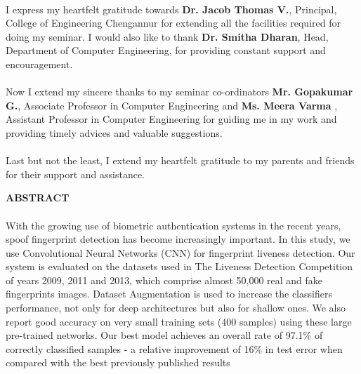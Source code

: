 \documentclass[a4paper,12pt,oneside]{article}
\begin{document}
\paragraph{}
I express my heartfelt gratitude towards \textbf{Dr. Jacob Thomas V.}, Principal, College
of Engineering Chengannur for extending all the facilities required for doing my seminar.
I would also like to thank \textbf{Dr. Smitha Dharan}, Head, Department of Computer
Engineering, for providing constant support and encouragement.
\paragraph{}
Now I extend my sincere thanks to my seminar co-ordinators \textbf{Mr. Gopakumar G.}, Associate
Professor in Computer Engineering and \textbf{Ms. Meera Varma} , Assistant
Professor in Computer Engineering for guiding me in my work and providing timely
advices and valuable suggestions.
\paragraph{}
Last but not the least, I extend my heartfelt gratitude to my parents and friends for
their support and assistance.	

\newpage

\begin{center}
\large{\textbf{ABSTRACT}}
\end{center}
\vspace{6ex}
\paragraph{}

With the growing use of biometric authentication
systems in the recent years, spoof fingerprint detection has become increasingly important. In this study, we use Convolutional Neural Networks (CNN) for fingerprint liveness detection. Our system is evaluated on the datasets used in The Liveness Detection Competition of years 2009, 2011 and 2013, which comprise almost 50,000 real and fake fingerprints images.  Dataset Augmentation is used to increase the classifiers performance, not only for deep architectures but also for shallow ones. We also report good accuracy on very small training sets (400 samples) using these large pre-trained networks. Our best model achieves an overall rate of 97.1\% of correctly classified samples - a relative improvement of 16\% in test error when compared with the best previously published results
\end{document}
